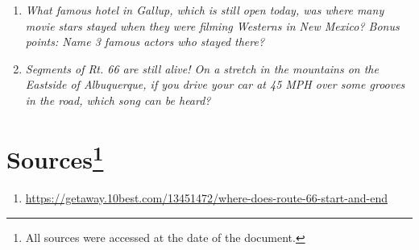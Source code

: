 \documentclass[12pt]{article}
\begin{document}
\begin{enumerate}
\begin{addmargin}[24pt]{0in}
        \end{addmargin}
    \item{\textit{What famous hotel in Gallup, which is still open today, was where many movie stars stayed when they were filming Westerns in New Mexico?  Bonus points: Name 3 famous actors who stayed there?}}
        \begin{addmargin}[24pt]{0in}
        \end{addmargin}
    \item{\textit{Segments of Rt. 66 are still alive! On a stretch in the mountains on the Eastside of Albuquerque, if you drive your car at 45 MPH over some grooves in the road, which song can be heard?}}
        \begin{addmargin}[24pt]{0in}
        \end{addmargin}
\end{enumerate}

\newpage

\section*{Sources\footnote{All sources were accessed at the date of the document.}}
\begin{enumerate}
    \item{\url{https://getaway.10best.com/13451472/where-does-route-66-start-and-end}}
\end{enumerate}
\end{document}
